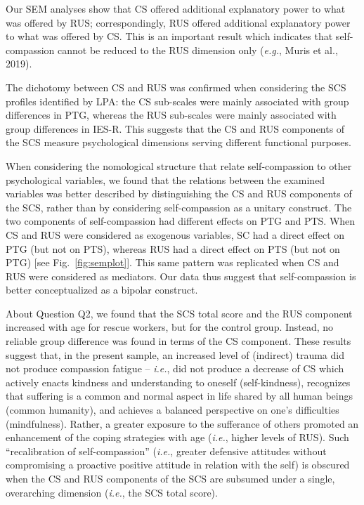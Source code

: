 \documentclass[
  english,
  man,floatsintext]{apa7}
\begin{document}
Our SEM analyses show that CS offered additional explanatory power to what was offered by RUS; correspondingly, RUS offered additional explanatory power to what was offered by CS. This is an important result which indicates that self-compassion cannot be reduced to the RUS dimension only (\emph{e.g.}, Muris et al., 2019).

The dichotomy between CS and RUS was confirmed when considering the SCS profiles identified by LPA: the CS sub-scales were mainly associated with group differences in PTG, whereas the RUS sub-scales were mainly associated with group differences in IES-R. This suggests that the CS and RUS components of the SCS measure psychological dimensions serving different functional purposes.

When considering the nomological structure that relate self-compassion to other psychological variables, we found that the relations between the examined variables was better described by distinguishing the CS and RUS components of the SCS, rather than by considering self-compassion as a unitary construct. The two components of self-compassion had different effects on PTG and PTS. When CS and RUS were considered as exogenous variables, SC had a direct effect on PTG (but not on PTS), whereas RUS had a direct effect on PTS (but not on PTG) {[}see Fig.~\ref{fig:semplot}{]}. This same pattern was replicated when CS and RUS were considered as mediators. Our data thus suggest that self-compassion is better conceptualized as a bipolar construct.

About Question Q2, we found that the SCS total score and the RUS component increased with age for rescue workers, but for the control group. Instead, no reliable group difference was found in terms of the CS component. These results suggest that, in the present sample, an increased level of (indirect) trauma did not produce compassion fatigue -- \emph{i.e.}, did not produce a decrease of CS which actively enacts kindness and understanding to oneself (self-kindness), recognizes that suffering is a common and normal aspect in life shared by all human beings (common humanity), and achieves a balanced perspective on one's difficulties (mindfulness). Rather, a greater exposure to the sufferance of others promoted an enhancement of the coping strategies with age (\emph{i.e.}, higher levels of RUS). Such ``recalibration of self-compassion'' (\emph{i.e.}, greater defensive attitudes without compromising a proactive positive attitude in relation with the self) is obscured when the CS and RUS components of the SCS are subsumed under a single, overarching dimension (\emph{i.e.}, the SCS total score).
\end{document}
